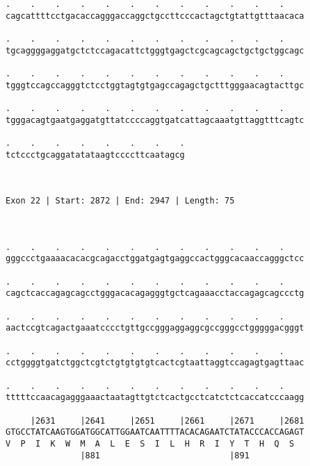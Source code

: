 \documentclass{article}
\begin{document}
\begin{Verbatim}
.    .    .    .    .    .    .    .    .    .    .    .    
cagcattttcctgacaccagggaccaggctgccttcccactagctgtattgtttaacaca
                                                            
.    .    .    .    .    .    .    .    .    .    .    .    
tgcaggggaggatgctctccagacattctgggtgagctcgcagcagctgctgctggcagc
                                                            
.    .    .    .    .    .    .    .    .    .    .    .    
tgggtccagccagggtctcctggtagtgtgagccagagctgctttgggaacagtacttgc
                                                            
.    .    .    .    .    .    .    .    .    .    .    .    
tgggacagtgaatgaggatgttatccccaggtgatcattagcaaatgttaggtttcagtc
                                                            
.    .    .    .    .    .    .    .
tctccctgcaggatatataagtccccttcaatagcg
                                    
                                    
 
Exon 22 | Start: 2872 | End: 2947 | Length: 75



.    .    .    .    .    .    .    .    .    .    .    .    
gggccctgaaaacacacgcagacctggatgagtgaggccactgggcacaaccagggctcc
                                                            
.    .    .    .    .    .    .    .    .    .    .    .    
cagctcaccagagcagcctgggacacagagggtgctcagaaacctaccagagcagccctg
                                                            
.    .    .    .    .    .    .    .    .    .    .    .    
aactccgtcagactgaaatcccctgttgccgggaggaggcgccgggcctgggggacgggt
                                                            
.    .    .    .    .    .    .    .    .    .    .    .    
cctggggtgatctggctcgtctgtgtgtgtcactcgtaattaggtccagagtgagttaac
                                                            
.    .    .    .    .    .    .    .    .    .    .    .    
tttttccaacagagggaaactaatagttgtctcactgcctcatctctcaccatcccaagg
                                                            
     |2631     |2641     |2651     |2661     |2671     |2681
GTGCCTATCAAGTGGATGGCATTGGAATCAATTTTACACAGAATCTATACCCACCAGAGT
V  P  I  K  W  M  A  L  E  S  I  L  H  R  I  Y  T  H  Q  S  
               |881                          |891           
  

\end{Verbatim}
\end{document}
